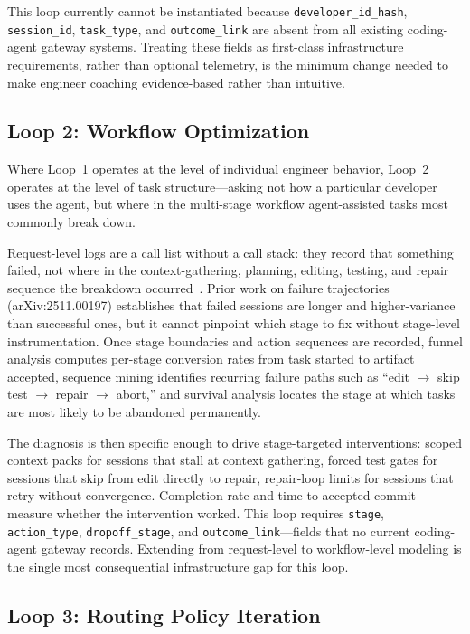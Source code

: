 \documentclass[sigconf,anonymous,review]{acmart}
\begin{document}
This loop currently cannot be instantiated because
\texttt{developer\_id\_hash}, \texttt{session\_id},
\texttt{task\_type}, and \texttt{outcome\_link} are absent from
all existing coding-agent gateway systems. Treating these fields
as first-class infrastructure requirements, rather than optional
telemetry, is the minimum change needed to make engineer coaching
evidence-based rather than intuitive.

\subsection{Loop 2: Workflow Optimization}

Where Loop~1 operates at the level of individual engineer behavior,
Loop~2 operates at the level of task structure---asking not how a
particular developer uses the agent, but where in the multi-stage
workflow agent-assisted tasks most commonly break down.

Request-level logs are a call list without a call stack: they record
that something failed, not where in the context-gathering, planning,
editing, testing, and repair sequence the breakdown occurred~\cite{%
majgaonkar2025trajectories, lu2025autonomous}. Prior work on failure
trajectories (arXiv:2511.00197) establishes that failed sessions
are longer and higher-variance than successful ones, but it cannot
pinpoint which stage to fix without stage-level instrumentation.
Once stage boundaries and action sequences are recorded, funnel
analysis computes per-stage conversion rates from task started to
artifact accepted, sequence mining identifies recurring failure
paths such as ``edit $\to$ skip test $\to$ repair $\to$ abort,''
and survival analysis locates the stage at which tasks are most
likely to be abandoned permanently.

The diagnosis is then specific enough to drive stage-targeted
interventions: scoped context packs for sessions that stall at
context gathering, forced test gates for sessions that skip from
edit directly to repair, repair-loop limits for sessions that
retry without convergence. Completion rate and time to accepted
commit measure whether the intervention worked. This loop requires
\texttt{stage}, \texttt{action\_type}, \texttt{dropoff\_stage},
and \texttt{outcome\_link}---fields that no current coding-agent
gateway records. Extending from request-level to workflow-level
modeling is the single most consequential infrastructure gap
for this loop.

\subsection{Loop 3: Routing Policy Iteration}
\end{document}
